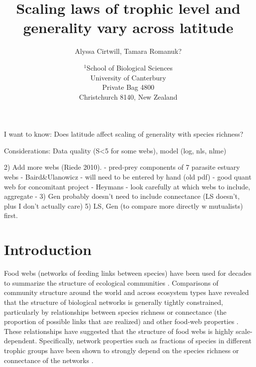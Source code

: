 \documentclass[12pt]{article}
\title{Scaling laws of trophic level and generality vary across latitude}
\author{Alyssa Cirtwill, Tamara Romanuk?}
\date{$^1$School of Biological Sciences\\University of Canterbury\\
Private Bag 4800\\Christchurch 8140, New Zealand}
\begin{document}
\maketitle
\baselineskip=8.5mm
 
\vspace{0.4 in}


I want to know: Does latitude affect scaling of generality with species richness? 

Considerations: Data quality (S<5 for some webs), model (log, nls, nlme)


2) Add more webs (Riede 2010).
    - pred-prey components of 7 parasite estuary webs
    - Baird\&Ulanowicz - will need to be entered by hand (old pdf) - good quant web for concomitant project
    - Heymans - look carefully at which webs to include, aggregate
    - 
3) Gen probably doesn't need to include connectance (LS doesn't, plus I don't actually care)
5) LS, Gen (to compare more directly w mutualists) first. 











\section*{Introduction}

Food webs (networks of feeding links between species) have been used for decades to summarize the structure of ecological communities \citep{Williams2000,earlierwork}.
Comparisons of community structure around the world and across ecosystem types 
have revealed that the structure of biological networks is generally tightly
constrained, particularly by relationships between species richness or connectance
(the proportion of possible links that are realized) and other food-web properties \citep{Riede2010}.
These relationships have suggested that the structure of food webs is highly scale-dependent. 
Specifically, network properties such as fractions of species in different trophic groups 
have been shown to strongly depend on the species richness or connectance of
the networks \citep{Vermaat2009,Riede2010}. 
\end{document}
